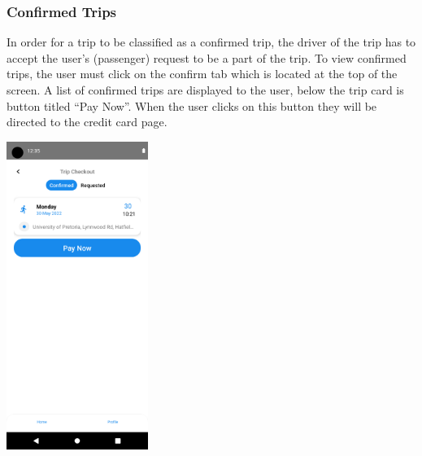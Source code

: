 \documentclass[hidelinks, 12pt, a4paper]{article}
\begin{document}
\subsubsection{Confirmed Trips}
In order for a trip to be classified as a confirmed trip, the driver of the trip has to accept the user’s (passenger) request to be a part of the trip. To view confirmed trips, the user must click on the confirm tab which is located at the top of the screen. A list of confirmed trips are displayed to the user, below the trip card is button titled “Pay Now”. When the user clicks on this button they will be directed to the credit card page.
\begin{center}
  \includegraphics[height=10cm]{images/confirmed.png}
\end{center}
\vspace{1cm}
\end{document}
